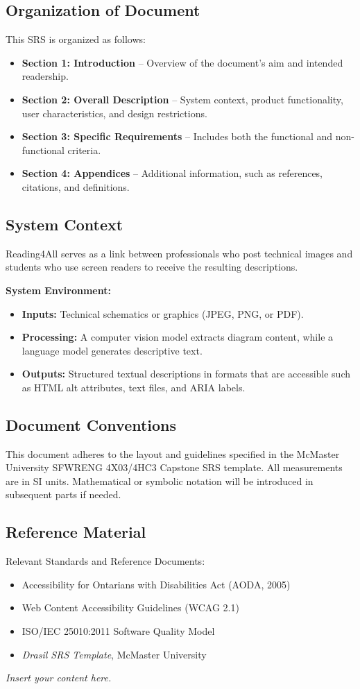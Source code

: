 \documentclass[12pt]{article}
\newcommand{\lips}{\textit{Insert your content here.}}
\begin{document}
\subsection{Organization of Document}
This SRS is organized as follows:
\begin{itemize}
    \item \textbf{Section 1: Introduction} – Overview of the document's aim and intended readership.
    \item \textbf{Section 2: Overall Description} – System context, product functionality, user characteristics, and design restrictions.
    \item \textbf{Section 3: Specific Requirements} – Includes both the functional and non-functional criteria.
    \item \textbf{Section 4: Appendices} – Additional information, such as references, citations, and definitions.
\end{itemize}

\subsection{System Context}
Reading4All serves as a link between professionals who post technical images and students who use screen readers to receive the resulting descriptions.

\noindent \textbf{System Environment:}
\begin{itemize}
    \item \textbf{Inputs:} Technical schematics or graphics (JPEG, PNG, or PDF).
    \item \textbf{Processing:} A computer vision model extracts diagram content, while a language model generates descriptive text.
    \item \textbf{Outputs:} Structured textual descriptions in formats that are accessible such as HTML alt attributes, text files, and ARIA labels.
\end{itemize}

\subsection{Document Conventions}
This document adheres to the layout and guidelines specified in the McMaster University SFWRENG 4X03/4HC3 Capstone SRS template. All measurements are in SI units. Mathematical or symbolic notation will be introduced in subsequent parts if needed.

\subsection{Reference Material}
Relevant Standards and Reference Documents:
\begin{itemize}
    \item Accessibility for Ontarians with Disabilities Act (AODA, 2005)
    \item Web Content Accessibility Guidelines (WCAG 2.1)
    \item ISO/IEC 25010:2011 Software Quality Model
    \item \textit{Drasil SRS Template}, McMaster University
\end{itemize}
\lips
\end{document}
